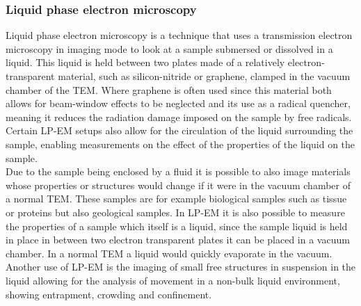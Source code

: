 \documentclass[a4paper]{scrartcl}
\begin{document}
\subsubsection*{Liquid phase electron microscopy}
Liquid phase electron microscopy is a technique that uses a transmission electron microscopy in imaging mode to look at a sample submersed or dissolved in a liquid. This liquid is held between two plates made of a relatively electron-transparent material, such as silicon-nitride or graphene, clamped in the vacuum chamber of the TEM. Where graphene is often used since this material both allows for beam-window effects to be neglected and its use as a radical quencher, meaning it reduces the radiation damage imposed on the sample by free radicals. Certain LP-EM setups also allow for the circulation of the liquid surrounding the sample, enabling measurements on the effect of the properties of the liquid on the sample.\\
Due to the sample being enclosed by a fluid it is possible to also image materials whose properties or structures would change if it were in the vacuum chamber of a normal TEM. These samples are for example biological samples such as tissue or proteins but also geological samples.
In LP-EM it is also possible to measure the properties of a sample which itself is a liquid, since the sample liquid is held in place in between two electron transparent plates it can be placed in a vacuum chamber. In a normal TEM a liquid would quickly evaporate in the vacuum. Another use of LP-EM is the imaging of small free structures in suspension in the liquid allowing for the analysis of movement in a non-bulk liquid environment, showing entrapment, crowding and confinement.
\end{document}
